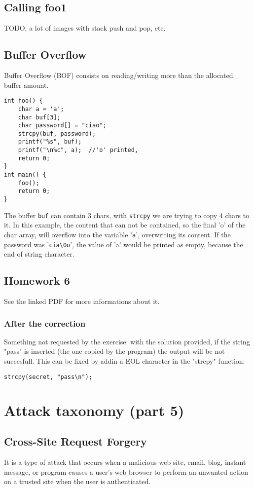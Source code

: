 \documentclass[a4paper, 10pt, titlepage]{article}
\begin{document}
\subsection{Calling foo1}
TODO, a lot of images with stack push and pop, etc.
\subsection{Buffer Overflow}
Buffer Overflow (BOF) consists on reading/writing more than the allocated buffer amount.

\begin{lstlisting}
int foo() {
	char a = 'a';
	char buf[3];
	char password[] = "ciao";
	strcpy(buf, password);
	printf("%s", buf);
    printf("\n%c", a);	//'o' printed,
	return 0;
}
int main() {
	foo();
	return 0;
}
\end{lstlisting}
The buffer \lstinline|buf| can contain 3 chars, with \lstinline|strcpy| we are trying to copy 4 chars to it. In this example, the content that can not be contained, so the final 'o' of the char array, will overflow into the variable '\lstinline|a|', overwriting its content. If the password was '\lstinline|cia\0o|', the value of 'a' would be printed as empty, because the end of string character.

\subsection{Homework 6}
See the linked PDF for more informations about it. 
\subsubsection{After the correction}
Something not requested by the exercise: with the solution provided, if the string "pass" is inserted (the one copied by the program) the output will be not succesfull. This can be fixed by addin a EOL character in the "strcpy" function:
\begin{verbatim}
strcpy(secret, "pass\n");
\end{verbatim}


\newpage
\section{Attack taxonomy (part 5)}
\subsection*{Cross-Site Request Forgery}
It is a type of attack that occurs when a malicious web site, email, blog, instant message, or program causes a user's web browser to perform an unwanted action on a trusted site when the user is authenticated.
\end{document}
